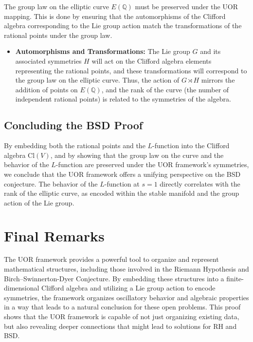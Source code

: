 \documentclass[11pt]{article}
\begin{document}
The group law on the elliptic curve \(E(\mathbb{Q})\) must be preserved under the UOR mapping. This is done by ensuring that the automorphisms of the Clifford algebra corresponding to the Lie group action match the transformations of the rational points under the group law.

\begin{itemize}
    \item \textbf{Automorphisms and Transformations:} The Lie group \(G\) and its associated symmetries \(H\) will act on the Clifford algebra elements representing the rational points, and these transformations will correspond to the group law on the elliptic curve. Thus, the action of \(G \rtimes H\) mirrors the addition of points on \(E(\mathbb{Q})\), and the rank of the curve (the number of independent rational points) is related to the symmetries of the algebra.
\end{itemize}

\subsection{Concluding the BSD Proof}

By embedding both the rational points and the \(L\)-function into the Clifford algebra \(\mathrm{Cl}(V)\), and by showing that the group law on the curve and the behavior of the \(L\)-function are preserved under the UOR framework’s symmetries, we conclude that the UOR framework offers a unifying perspective on the BSD conjecture. The behavior of the \(L\)-function at \(s = 1\) directly correlates with the rank of the elliptic curve, as encoded within the stable manifold and the group action of the Lie group.

\section{Final Remarks}

The UOR framework provides a powerful tool to organize and represent mathematical structures, including those involved in the Riemann Hypothesis and Birch–Swinnerton-Dyer Conjecture. By embedding these structures into a finite-dimensional Clifford algebra and utilizing a Lie group action to encode symmetries, the framework organizes oscillatory behavior and algebraic properties in a way that leads to a natural conclusion for these open problems. This proof shows that the UOR framework is capable of not just organizing existing data, but also revealing deeper connections that might lead to solutions for RH and BSD.
\end{document}
